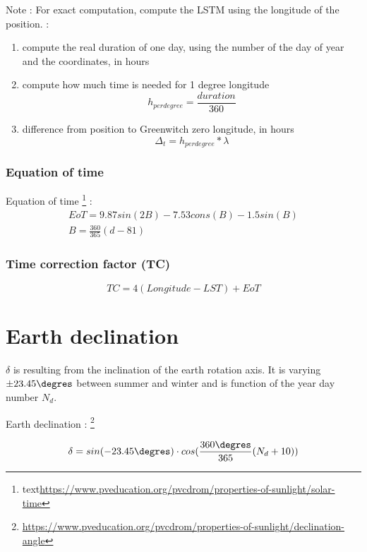 \documentclass[12pt,a4paper]{article}
\begin{document}
Note : For exact computation, compute the LSTM using the longitude of the position. :
\begin{enumerate}
	\item compute the real duration of one day, using the number of the day of year and the coordinates, in hours
	\item compute how much time is needed for 1 degree longitude
	\begin{equation}
		h_{per degree} = \frac{duration}{360}
	\end{equation}
	\item difference from position to Greenwitch zero longitude, in hours
	\begin{equation}
		\Delta_t = h_{per degree}  * \lambda
	\end{equation}
\end{enumerate}

\subsubsection{Equation of time}
Equation of time \footnote{text\url{https://www.pveducation.org/pvcdrom/properties-of-sunlight/solar-time}} :
\begin{eqnarray}
	EoT = 9.87 sin(2B) - 7.53 cons(B) - 1.5 sin(B)\\
	B = \frac{360}{365}(d-81)
\end{eqnarray}
\subsubsection{Time correction factor (TC)}
\begin{equation}
	TC = 4 (Longitude-LST)+ EoT
\end{equation}

\section{Earth declination}

$\delta$ is resulting from the inclination of the earth rotation axis. It is varying $\pm 23.45 \degres$ between summer and winter and is function of the year day number $N_d$.

Earth declination : \footnote{\url{https://www.pveducation.org/pvcdrom/properties-of-sunlight/declination-angle}}

\begin{eqnarray}
	\delta = sin(-23.45 \degres) \cdot 
	cos(\frac{360 \degres}{365} (N_d +10))
\end{eqnarray}
\end{document}
